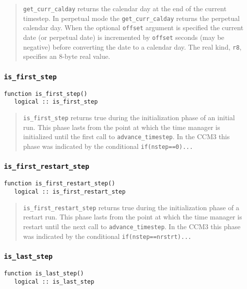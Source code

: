 \documentclass[12pt]{article}
\newcommand{\code}[1]{\texttt{#1}}
\begin{document}
\begin{quote}
\code{get\_curr\_calday} returns the calendar day at the end of the current
timestep.  In perpetual mode the \code{get\_curr\_calday} returns the
perpetual calendar day.  When the optional \code{offset} argument is
specified the current date (or perpetual date) is incremented by
\code{offset} seconds (may be negative) before converting the date to a
calendar day.  The real kind, \code{r8}, specifies an 8-byte real value.
\end{quote}

\subsubsection{\code{is\_first\_step}}
\begin{verbatim}
function is_first_step()
   logical :: is_first_step
\end{verbatim}

\begin{quote}
\code{is\_first\_step} returns true during the initialization phase of an
initial run.  This phase lasts from the point at which the time manager is
initialized until the first call to \code{advance\_timestep}.  In the CCM3
this phase was indicated by the conditional \code{if(nstep==0)...}
\end{quote}

\subsubsection{\code{is\_first\_restart\_step}}
\begin{verbatim}
function is_first_restart_step()
   logical :: is_first_restart_step
\end{verbatim}

\begin{quote}
\code{is\_first\_restart\_step} returns true during the initialization
phase of a restart run.  This phase lasts from the point at which the time
manager is restart until the next call to \code{advance\_timestep}.  In the
CCM3 this phase was indicated by the conditional
\code{if(nstep==nrstrt)...}
\end{quote}

\subsubsection{\code{is\_last\_step}}
\begin{verbatim}
function is_last_step()
   logical :: is_last_step
\end{verbatim}
\end{document}
